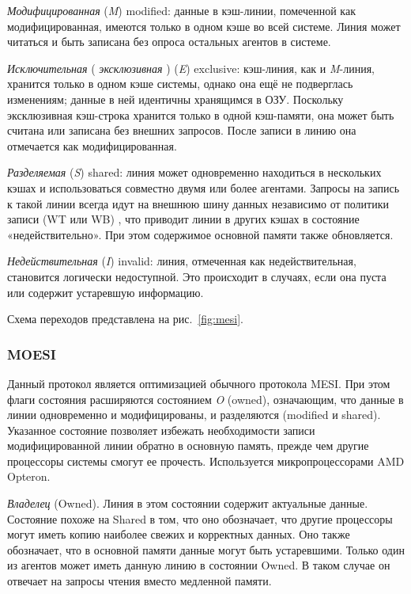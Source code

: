 \begin{itemize*}
\item    \textit{Модифицированная} (\textit{M}) \abbr modified: данные в кэш-линии, помеченной как модифицированная, имеются только в одном кэше во всей системе. Линия может читаться и быть записана без опроса остальных агентов в системе.

\item    \textit{Исключительная} ( \textit{эксклюзивная} ) (\textit{E}) \abbr exclusive: кэш-линия, как и \textit{M}-линия, хранится только в одном кэше системы, однако она ещё не подверглась изменениям; данные в ней идентичны хранящимся в ОЗУ. Поскольку эксклюзивная кэш-строка хранится только в одной кэш-памяти, она может быть считана или записана без внешних запросов. После записи в линию она отмечается как модифицированная.

\item    \textit{Разделяемая} (\textit{S}) \abbr shared: линия может одновременно находиться в нес\-коль\-ких кэшах и использоваться совместно двумя или более агентами. Запросы на запись к такой линии  всегда идут на внешнюю шину данных независимо от политики записи (WT или WB) , что приводит линии в других кэшах в состояние «недействительно». При этом содержимое основной памяти также обновляется.

\item    \textit{Недействительная} (\textit{I}) \abbr invalid: линия, отмеченная как недействительная, становится логически недоступной. Это происходит в случаях, если она пуста или содержит устаревшую информацию. 

\end{itemize*}
Схема переходов представлена на рис.~\ref{fig:mesi}.

\subsubsection{MOESI}

Данный протокол является оптимизацией  обычного протокола MESI. При этом флаги состояния расширяются состоянием \textit{O} (\abbr owned), означающим, что данные в линии одновременно и модифицированы, и разделяются (modified и shared). Указанное состояние позволяет избежать необходимости записи модифицированной линии обратно в основную память, прежде чем другие процессоры системы смогут ее прочесть. Используется микропроцессорами AMD Opteron.
\begin{itemize*}
\item    \textit{Владелец} (Owned). Линия в этом состоянии содержит актуальные данные. Состояние похоже на Shared в том, что оно обозначает, что другие процессоры могут иметь копию наиболее свежих и корректных данных. Оно также обозначает, что в основной памяти данные могут быть устаревшими. Только один из агентов может иметь данную линию в состоянии Owned. В таком случае он отвечает на запросы чтения вместо медленной памяти.
\end{itemize*}

